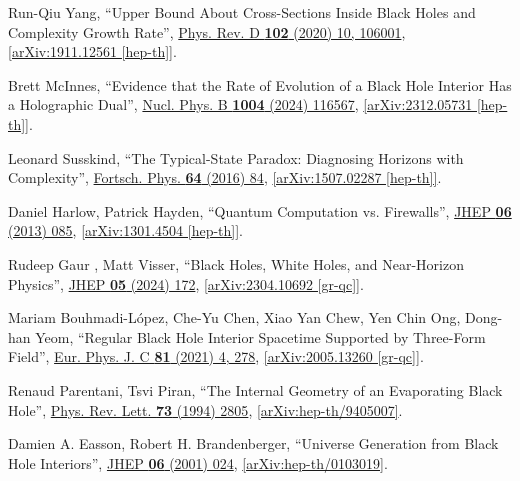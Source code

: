 \documentclass[preprintnumbers, floatfix, preprintnumbers, letterpaper, twocolumn, superscriptaddress,nofootinbib]{revtex4-2}
\begin{document}
\begin{thebibliography}{99}
Run-Qiu Yang, ``Upper Bound About Cross-Sections Inside Black Holes and Complexity Growth Rate'', {\hypersetup{urlcolor=vividviolet}\href{https://journals.aps.org/prd/abstract/10.1103/PhysRevD.102.106001}{Phys. Rev. D \textbf{102} (2020) 10, 106001}}, \href{https://arxiv.org/abs/1911.12561}{[arXiv:1911.12561 [hep-th]]}.

Brett McInnes, ``Evidence that the Rate of Evolution of a Black Hole Interior Has a Holographic Dual'', {\hypersetup{urlcolor=vividviolet}\href{https://www.sciencedirect.com/science/article/pii/S0550321324001330}{Nucl. Phys. B \textbf{1004} (2024) 116567}}, \href{https://arxiv.org/abs/2312.05731}{[arXiv:2312.05731 [hep-th]]}.

Leonard Susskind, ``The Typical-State Paradox: Diagnosing Horizons with Complexity'', {\hypersetup{urlcolor=vividviolet}\href{https://onlinelibrary.wiley.com/doi/10.1002/prop.201500091}{Fortsch. Phys. \textbf{64} (2016) 84}}, \href{https://arxiv.org/abs/1507.02287}{[arXiv:1507.02287 [hep-th]]}.

Daniel Harlow, Patrick Hayden, ``Quantum Computation vs. Firewalls'',  {\hypersetup{urlcolor=vividviolet}\href{https://link.springer.com/article/10.1007/JHEP06(2013)085}{JHEP \textbf{06} (2013) 085}}, \href{https://arxiv.org/abs/1301.4504}{[arXiv:1301.4504 [hep-th]]}.

Rudeep Gaur , Matt Visser, ``Black Holes, White Holes, and Near-Horizon Physics'', {\hypersetup{urlcolor=vividviolet}\href{https://doi.org/10.1007/JHEP05(2024)172}{JHEP \textbf{05} (2024) 172}}, \href{https://arxiv.org/abs/2304.10692}{[arXiv:2304.10692 [gr-qc]]}.

Mariam Bouhmadi-López, Che-Yu Chen, Xiao Yan Chew, Yen Chin Ong, Dong-han Yeom, ``Regular Black Hole Interior Spacetime Supported by Three-Form Field'', {\hypersetup{urlcolor=vividviolet}\href{https://link.springer.com/article/10.1140/epjc/s10052-021-09080-1}{Eur. Phys. J. C \textbf{81} (2021) 4, 278}}, \href{https://arxiv.org/abs/2005.13260}{[arXiv:2005.13260 [gr-qc]]}.

Renaud Parentani, Tsvi Piran, ``The Internal Geometry of an Evaporating Black Hole'', {\hypersetup{urlcolor=vividviolet}\href{https://journals.aps.org/prl/abstract/10.1103/PhysRevLett.73.2805}{Phys. Rev. Lett. \textbf{73} (1994) 2805}}, \href{https://arxiv.org/abs/hep-th/9405007v2}{[arXiv:hep-th/9405007]}.

Damien A. Easson, Robert H. Brandenberger, ``Universe Generation from Black Hole Interiors'', {\hypersetup{urlcolor=vividviolet}\href{https://iopscience.iop.org/article/10.1088/1126-6708/2001/06/024}{JHEP \textbf{06} (2001) 024}}, \href{https://arxiv.org/abs/hep-th/0103019}{[arXiv:hep-th/0103019]}.


\end{thebibliography}
\end{document}
